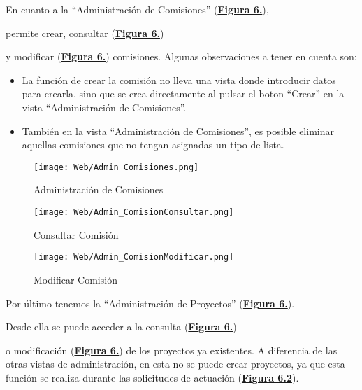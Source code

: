 \addtocounter{figura_manual}{1} En cuanto a la ``Administración de Comisiones'' (\textbf{\hyperref[fig:Web_Admin_Comisiones]{Figura 6.}}),\addtocounter{figura_manual}{1} permite crear, consultar (\textbf{\hyperref[fig:Web_Admin_ComisionConsultar]{Figura 6.}})\addtocounter{figura_manual}{1} y modificar (\textbf{\hyperref[fig:Web_Admin_ComisionModificar]{Figura 6.}}) comisiones. Algunas observaciones a tener en cuenta son:
\begin{itemize}
  \item La función de crear la comisión no lleva una vista donde introducir datos para crearla, sino que se crea directamente al pulsar el boton ``Crear'' en la vista ``Administración de Comisiones''.
  \item También en la vista ``Administración de Comisiones'', es posible eliminar aquellas comisiones que no tengan asignadas un tipo de lista.
\end{itemize}

\begin{figure}[!htbp]
  \centering
  \texttt{[image: Web/Admin\_Comisiones.png]}
  \caption{Administración de Comisiones}
  \label{fig:Web_Admin_Comisiones}
\end{figure}
\FloatBarrier

\begin{figure}[!htbp]
  \centering
  \texttt{[image: Web/Admin\_ComisionConsultar.png]}
  \caption{Consultar Comisión}
  \label{fig:Web_Admin_ComisionConsultar}
\end{figure}
\FloatBarrier

\begin{figure}[!htbp]
  \centering
  \texttt{[image: Web/Admin\_ComisionModificar.png]}
  \caption{Modificar Comisión}
  \label{fig:Web_Admin_ComisionModificar}
\end{figure}
\FloatBarrier

\addtocounter{figura_manual}{1} Por último tenemos la ``Administración de Proyectos'' (\textbf{\hyperref[fig:Web_Admin_Proyectos]{Figura 6.}}).\addtocounter{figura_manual}{1} Desde ella se puede acceder a la consulta (\textbf{\hyperref[fig:Web_Admin_ProyectoConsultar]{Figura 6.}})\addtocounter{figura_manual}{1} o modificación (\textbf{\hyperref[fig:Web_Admin_ProyectoModificar]{Figura 6.}}) de los proyectos ya existentes. A diferencia de las otras vistas de administración, en esta no se puede crear proyectos, ya que esta función se realiza durante las solicitudes de actuación (\textbf{\hyperref[fig:Web_TAP_SolicitarActuacion]{Figura 6.2}}). 


